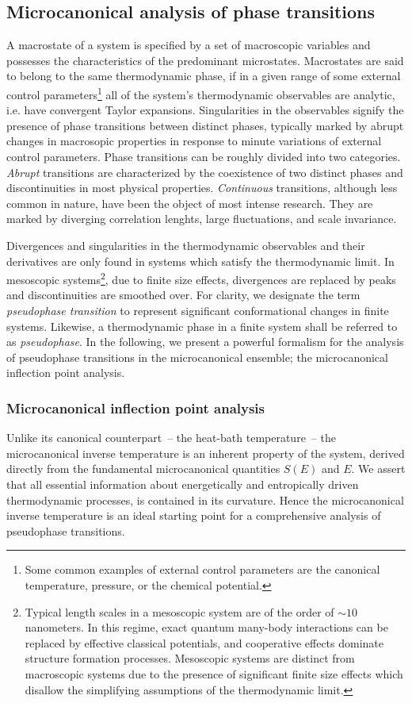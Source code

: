 \documentclass[12pt]{report}
\begin{document}
\subsection{Microcanonical analysis of phase transitions}
A macrostate of a system is specified by a set of macroscopic variables and possesses the characteristics of the predominant microstates. Macrostates are said to belong to the same thermodynamic phase, if in a given range of some external control parameters\footnote{Some common examples of external control parameters are the canonical temperature, pressure, or the chemical potential.} all of the system's thermodynamic observables are analytic, i.e. have convergent Taylor expansions. Singularities in the observables signify the presence of phase transitions between distinct phases, typically marked by abrupt changes in macrosopic properties in response to minute variations of external control parameters. Phase transitions can be roughly divided into two categories. \textit{Abrupt} transitions are characterized by the coexistence of two distinct phases and discontinuities in most physical properties. \textit{Continuous} transitions, although less common in nature, have been the object of most intense research. They are marked by diverging correlation lenghts, large fluctuations, and scale invariance. 

Divergences and singularities in the thermodynamic observables and their derivatives are only found in systems which satisfy the thermodynamic limit. In mesoscopic systems\footnote{Typical length scales in a mesoscopic system are of the order of $\sim 10$ nanometers. In this regime, exact quantum many-body interactions can be replaced by effective classical potentials, and cooperative effects dominate structure formation processes. Mesoscopic systems are distinct from macroscopic systems due to the presence of significant finite size effects which disallow the simplifying assumptions of the thermodynamic limit.}, due to finite size effects, divergences are replaced by peaks and discontinuities are smoothed over. For clarity, we designate the term \textit{pseudophase transition} to represent significant conformational changes in finite systems. Likewise, a thermodynamic phase in a finite system shall be referred to as \textit{pseudophase}. In the following, we present a powerful formalism for the analysis of pseudophase transitions in the microcanonical ensemble; the microcanonical inflection point analysis.

\subsubsection{Microcanonical inflection point analysis}
Unlike its canonical counterpart~-- the heat-bath temperature~-- the
microcanonical inverse temperature is an inherent property of the system, derived directly from the fundamental microcanonical quantities $S(E)$ and $E$. We assert that all essential information about energetically and entropically driven thermodynamic processes, is contained in its curvature. Hence the microcanonical inverse temperature is an ideal starting point for a comprehensive analysis of pseudophase transitions.  
\end{document}
